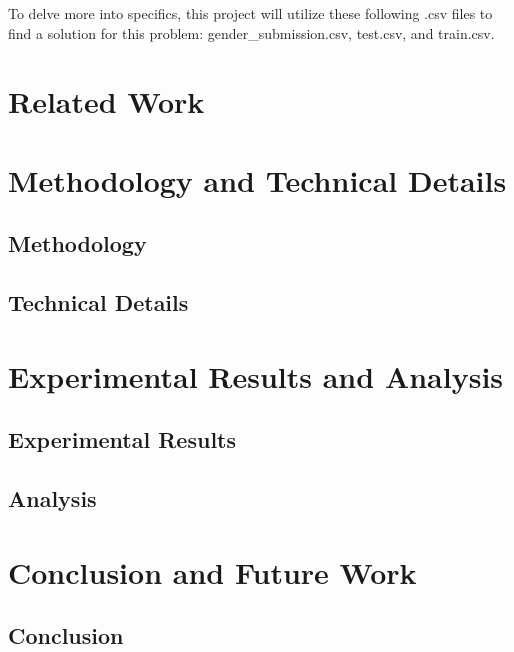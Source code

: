 \documentclass{APA}[12pt]
\begin{document}
To delve more into specifics, this project will utilize these following .csv files to find a solution for this problem: gender\_submission.csv, test.csv, and train.csv.

\newpage



\section{Related Work}


\newpage



\section{Methodology and Technical Details}

\subsection{Methodology}

\subsection{Technical Details}

\newpage



\section{Experimental Results and Analysis}

\subsection{Experimental Results}

\subsection{Analysis}


\newpage

\section{Conclusion and Future Work}

\subsection{Conclusion}
\end{document}
